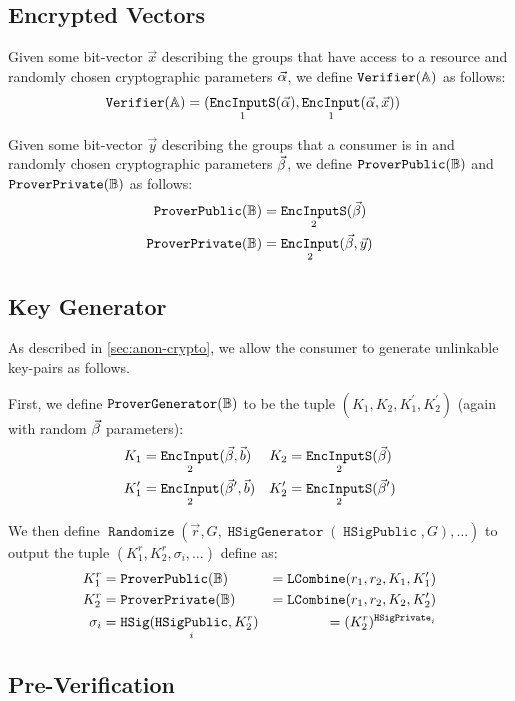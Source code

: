 \documentclass[pdftex,12pt,a4papaer,twoside,notitlepage]{report}
\DeclareMathOperator{\ein}{\mathtt{EncInput}}
\DeclareMathOperator{\combine}{\mathtt{LCombine}}
\DeclareMathOperator{\eins}{\mathtt{EncInputS}}
\DeclareMathOperator{\Hsig}{\mathtt{HSig}}
\DeclareMathOperator{\Hp}{\mathtt{HSigPublic}}
\DeclareMathOperator{\Hs}{\mathtt{HSigPrivate}}
\DeclareMathOperator{\HsigG}{\mathtt{HSigGenerator}}
\DeclareMathOperator{\rand}{\mathtt{Randomize}}
\begin{document}
\subsection{Encrypted Vectors}

Given some bit-vector $\vec{x}$ describing the groups that have access to a
resource and randomly chosen cryptographic parameters $\vec{\alpha}$, we define $\operatorname{\mathtt{Verifier}}(\mathbb{A})$
as follows:
\begin{align*}
  \Vv &= (\eins_1(\Ap), \ein_1(\Ap, \vec{x}))
\end{align*}

Given some bit-vector $\vec{y}$ describing the groups that a consumer is in and
randomly chosen cryptographic parameters $\vec{\beta}$, we define $\operatorname{\mathtt{ProverPublic}}(\mathbb{B})$ and $\operatorname{\mathtt{ProverPrivate}}(\mathbb{B})$ as
follows:
\begin{align*}
  \Pv &= \eins_2(\Bp) \\
  \Sv &= \ein_2(\Bp, \vec{y}) \\
\end{align*}

\subsection{Key Generator}

As described in \cref{sec:anon-crypto}, we allow the consumer to generate
unlinkable key-pairs as follows.

First, we define $\operatorname{\mathtt{ProverGenerator}}(\mathbb{B})$ to be the tuple $(K_1, K_2, K_1^\prime, K_2^\prime)$
(again with random $\vec{\beta}$ parameters):
\begin{align*}
  K_1 &= \ein_2(\Bp, \vec{b}) & K_2 &= \eins_2(\Bp) \\
  K^\prime_1 &= \ein_2(\Bp^\prime, \vec{b}) & K^\prime_2 &= \eins_2(\Bp^\prime)
\end{align*}

We then define $\rand(\vec{r}, G, \HsigG(\Hp, G), \ldots)$ to output the tuple
$(K^r_1, K^r_2, \sigma_i,\ldots)$ define as:
\begin{align*}
  K^r_1 &= \Pv &= \combine(r_1, r_2, K_1, K_1^\prime) \\
  K^r_2 &= \Sv &= \combine(r_1, r_2, K_2, K_2^\prime) \\
  \sigma_i &= \Hsig(\Hp_i, K^r_2) &= (K^r_2)^{\Hs_i}
\end{align*}

\subsection{Pre-Verification}
\label{sec:pre-verify-define}
\end{document}
